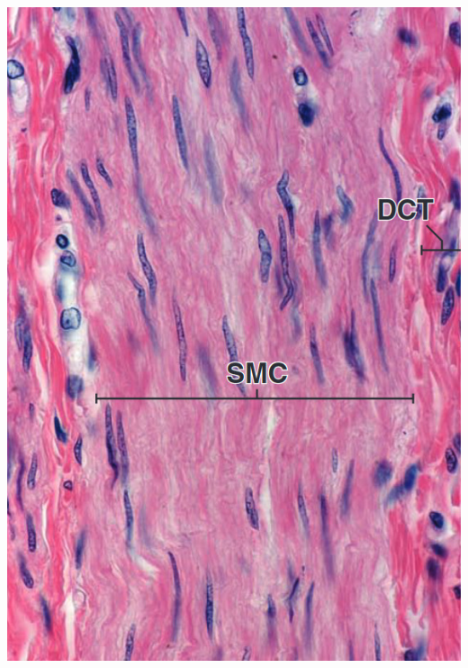 \begin{itemize}
\begin{center}
    \includegraphics[scale=0.25]{images/week-1-rp12.jpg}


\end{center}
\end{itemize}
